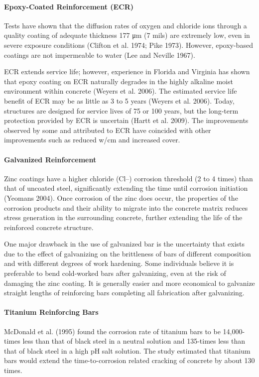 \paragraph{Epoxy-Coated Reinforcement (ECR)}
Tests have shown that the diffusion rates of oxygen and chloride ions through a quality coating of adequate
thickness 177 μm (7 mils) are extremely low, even in severe exposure conditions (Clifton et al. 1974; Pike 1973).
However, epoxy-based coatings are not impermeable to water (Lee and Neville 1967).

ECR extends service life; however, experience in Florida and Virginia has shown that epoxy coating on ECR
naturally degrades in the highly alkaline moist environment within concrete (Weyers et al. 2006). The estimated
service life benefit of ECR may be as little as 3 to 5 years (Weyers et al. 2006). Today, structures are designed for
service lives of 75 or 100 years, but the long-term protection provided by ECR is uncertain (Hartt et al. 2009). The
improvements observed by some and attributed to ECR have coincided with other improvements such as reduced
w/cm and increased cover.

\paragraph{Galvanized Reinforcement}
Zinc coatings have a higher chloride (Cl–) corrosion threshold (2 to 4 times) than that of uncoated steel,
significantly extending the time until corrosion initiation (Yeomans 2004). Once corrosion of the zinc does occur,
the properties of the corrosion products and their ability to migrate into the concrete matrix reduces stress generation
in the surrounding concrete, further extending the life of the reinforced concrete structure.

One major drawback in the use of galvanized bar is the uncertainty that exists due to the effect of galvanizing on
the brittleness of bars of different composition and with different degrees of work hardening. Some individuals
believe it is preferable to bend cold-worked bars after galvanizing, even at the risk of damaging the zinc coating. It is
generally easier and more economical to galvanize straight lengths of reinforcing bars completing all fabrication after
galvanizing.

\paragraph{Titanium Reinforcing Bars}
McDonald et al. (1995) found the corrosion rate of titanium bars to be 14,000-times less than that of black steel
in a neutral solution and 135-times less than that of black steel in a high pH salt solution. The study estimated that
titanium bars would extend the time-to-corrosion related cracking of concrete by about 130 times.

